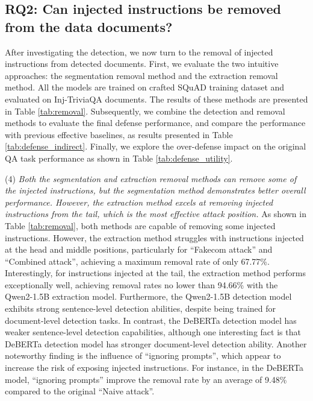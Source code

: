 \subsection{RQ2: Can injected instructions be removed from the data documents?}
After investigating the detection, we now turn to the removal of injected instructions from detected documents. First, we evaluate the two intuitive approaches: the segmentation removal method and the extraction removal method. All the models are trained on crafted SQuAD training dataset and evaluated on Inj-TriviaQA documents. The results of these methods are presented in Table \ref{tab:removal}. Subsequently, we combine the detection and removal methods to evaluate the final defense performance, and compare the performance with previous effective baselines, as results presented in Table \ref{tab:defense_indirect}. Finally, we explore the over-defense impact on the original QA task performance as shown in Table \ref{tab:defense_utility}.

\vspace{5pt}
(4) \textit{Both the segmentation and extraction removal methods can remove some of the injected instructions, but the segmentation method demonstrates better overall performance. However, the extraction method excels at removing injected instructions from the tail, which is the most effective attack position.}
As shown in Table \ref{tab:removal}, both methods are capable of removing some injected instructions. However, the extraction method struggles with instructions injected at the head and middle positions, particularly for ``Fakecom attack'' and ``Combined attack'', achieving a maximum removal rate of only 67.77\%. Interestingly, for instructions injected at the tail, the extraction method performs exceptionally well, achieving removal rates no lower than 94.66\% with the Qwen2-1.5B extraction model.
Furthermore, the Qwen2-1.5B detection model exhibits strong sentence-level detection abilities, despite being trained for document-level detection tasks. In contrast, the DeBERTa detection model has weaker sentence-level detection capabilities,  although one interesting fact is that DeBERTa detection model has stronger document-level detection ability. Another noteworthy finding is the influence of ``ignoring prompts'', which appear to increase the risk of exposing injected instructions. For instance, in the DeBERTa model, ``ignoring prompts'' improve the removal rate by an average of 9.48\% compared to the original ``Naive attack''.

